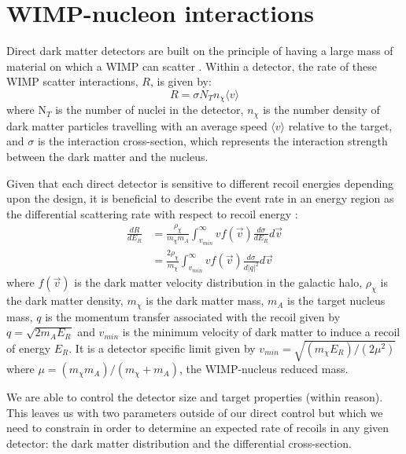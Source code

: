 \section{WIMP-nucleon interactions} \label{sec:wimp_nucleus_interactions}

Direct dark matter detectors are built on the principle of having a large mass of material on which a WIMP can scatter \cite{direct_detection_of_wimps_ref}.
Within a detector, the rate of these WIMP scatter interactions, $R$, is given by:
\begin{equation}
    R = \sigma N_{T} n_{\chi} \langle v \rangle
    \label{eq:wimp_nucleon_rate}
\end{equation}
where N$_{T}$ is the number of nuclei in the detector, $n_\chi$ is the number density of dark matter particles travelling with an average speed $\langle v \rangle$ relative to the target, and $\sigma$ is the interaction cross-section, which represents the interaction strength between the dark matter and the nucleus.
\par
Given that each direct detector is sensitive to different recoil energies depending upon the design, it is beneficial to describe the event rate in an energy region as the differential scattering rate with respect to recoil energy \cite{supersymetry_wimpy_boi_ref}:
\begin{equation}
\begin{split}
    \frac{dR}{dE_R} &= \frac{\rho_{\chi}}{m_\chi m_A} \int^{\infty}_{v_{min}} v f(\vec{v}) \frac{d\sigma}{dE_R} d\vec{v} \\
                    &= \frac{2\rho_{\chi}}{m_\chi} \int^{\infty}_{v_{min}} v f(\vec{v}) \frac{d\sigma}{d |q|^2} d\vec{v}
\end{split}
\label{eq:wimp_differential_rate}
\end{equation}
where $f(\vec{v})$ is the dark matter velocity distribution in the galactic halo, $\rho_{\chi}$ is the dark matter density, $m_\chi$ is the dark matter mass, $m_A$ is the target nucleus mass, $q$ is the momentum transfer associated with the recoil given by $q = \sqrt{2m_A E_R}$ and $v_{min}$ is the minimum velocity of dark matter to induce a recoil of energy $E_R$.
It is a detector specific limit given by $v_{min} = \sqrt{(m_\chi E_R)/(2\mu^2)}$ where $\mu = (m_\chi m_A)/(m_\chi + m_A)$, the WIMP-nucleus reduced mass.
\par
We are able to control the detector size and target properties (within reason).
This leaves us with two parameters outside of our direct control but which we need to constrain in order to determine an expected rate of recoils in any given detector: the dark matter distribution and the differential cross-section.

